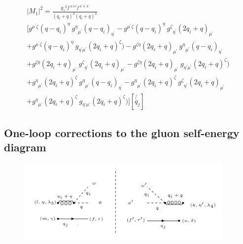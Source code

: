 \begin{equation}
\begin{split}
|M_1|^2=\frac{{g_s}^2 f^{\:a\:o\:l} f^{\:a^{\prime}\:o^{\prime}\:k}}{(q_i +q)^2 (q_i +q)^2}\\
[g^{{{\mu}^{\prime}}{\zeta}}(q-q_i)^{\eta}\:{g^{\eta}}_{{\mu}^{\prime}}(q-q_i)_{{\eta}^{\prime}}
-g^{{{\mu}^{\prime}}{\zeta}}(q-q_i)^{\eta}\:{g^{\zeta}}_{{\eta}^{\prime}}(2q_i +q)_{{\mu}^{\prime}}\\
+g^{{{\mu}^{\prime}}{\zeta}}(q-q_i)^{\eta}\:g_{{{\eta}^{\prime}}{{\mu}^{\prime}}}(2q_i +q)^{\zeta})
-g^{{\zeta}{\eta}}(2q_i +q)_{{\mu}^{\prime}}\:{g^{\eta}}_{{\mu}^{\prime}}(q-q_i)_{{\eta}^{\prime}}\\
+g^{{\zeta}{\eta}}(2q_i +q)_{{\mu}^{\prime}}\:{g^{\zeta}}_{{\eta}^{\prime}}(2q_i +q)_{{\mu}^{\prime}}
-g^{{\zeta}{\eta}}(2q_i +q)_{{\mu}^{\prime}}\:g_{{{\eta}^{\prime}}{{\mu}^{\prime}}}(2q_i +q)^{\zeta})\\
+{g^{\eta}}_{{\mu}^{\prime}}(2q_i +q)^{\zeta}\:{g^{\eta}}_{{\mu}^{\prime}}(q-q_i)_{{\eta}^{\prime}}
-{g^{\eta}}_{{\mu}^{\prime}}(2q_i +q)^{\zeta}\:{g^{\zeta}}_{{\eta}^{\prime}}(2q_i +q)_{{\mu}^{\prime}}\\
+{g^{\eta}}_{{\mu}^{\prime}}(2q_i +q)^{\zeta}\:g_{{{\eta}^{\prime}}{{\mu}^{\prime}}}(2q_i +q)^{\zeta})][\not{q_j}]
\end{split}
\end{equation}

\pagebreak
\subsection{One-loop corrections to the gluon self-energy diagram}
\begin{figure}[h!]
\centering
\includegraphics[width=0.95\textwidth]{images/ghostM1squer.png}
\end{figure}






\pagebreak

